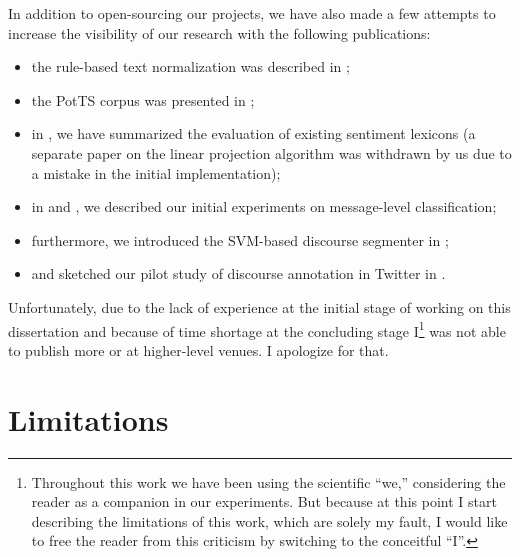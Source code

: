 In addition to open-sourcing our projects, we have also made a few
attempts to increase the visibility of our research with the following
publications:
\begin{itemize}
  \item the rule-based text normalization was described in
    \cite{Sidarenka:13};
  \item the PotTS corpus was presented in \cite{Sidarenka:16};
  \item in \cite{Sidarenka:16b}, we have summarized the evaluation of
    existing sentiment lexicons (a separate paper on the linear
    projection algorithm was withdrawn by us due to a mistake in the
    initial implementation);
  \item in \cite{Sidarenka:16a} and \cite{Sidarenka:17}, we described
    our initial experiments on message-level classification;
  \item furthermore, we introduced the SVM-based discourse segmenter
    in \cite{Sidarenka:15};
  \item and sketched our pilot study of discourse annotation in
    Twitter in \cite{Sidarenka:15a}.
\end{itemize}
Unfortunately, due to the lack of experience at the initial stage of
working on this dissertation and because of time shortage at the
concluding stage I\footnote{Throughout this work we have been using
  the scientific ``we,'' considering the reader as a companion in our
  experiments.  But because at this point I start describing the
  limitations of this work, which are solely my fault, I would like to
  free the reader from this criticism by switching to the conceitful
  ``I''.} was not able to publish more or at higher-level venues.  I
apologize for that.


\section*{Limitations}

